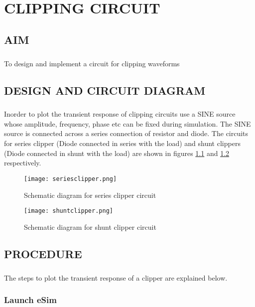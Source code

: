 \chapter{CLIPPING CIRCUIT}

\section*{AIM}
\paragraph{}To design and implement a circuit for clipping waveforms
\section*{DESIGN AND CIRCUIT DIAGRAM}
\paragraph{}

Inorder to plot the transient response of clipping circuits use a SINE source whose amplitude, frequency, phase etc can be fixed during simulation. The SINE source is connected across a series connection of resistor and diode. The circuits for series clipper (Diode connected in series with the load) and shunt clippers (Diode connected in shunt with the load)  are shown in figures \ref{seriesclipper} and  \ref{shuntclipper} respectively. 


\begin{figure}[h]
\centering
\texttt{[image: seriesclipper.png]}
\caption{Schematic diagram for series clipper circuit}
\label{seriesclipper}
\end{figure}

\begin{figure}[h]
\centering
\texttt{[image: shuntclipper.png]}
\caption{Schematic diagram for shunt clipper circuit}
\label{shuntclipper}
\end{figure}

\section*{PROCEDURE}

\paragraph{}The steps to plot the transient response of a clipper are explained below. 
\subsection*{Launch eSim}

